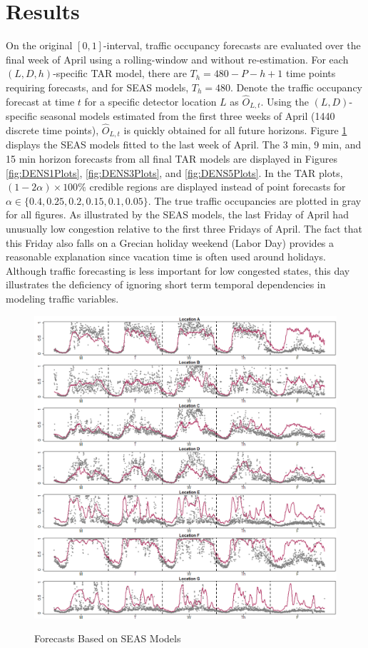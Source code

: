 \section{Results}
\label{sec:trafficresults}
On the original $[0,1]$-interval, traffic occupancy forecasts are evaluated over the final week of April using a rolling-window and without re-estimation. For each $(L,D,h)$-specific TAR model, there are $T_h=480-P-h+1$ time points requiring forecasts, and for SEAS models, $T_h=480$. Denote the traffic occupancy forecast at time $t$ for a specific detector location $L$ as $\hat{O}_{L,t}$. Using the $(L,D)$-specific seasonal models estimated from the first three weeks of April (1440 discrete time points), $\hat{O}_{L,t}$ is quickly obtained for all future horizons. Figure \ref{fig:SEASESTPlots} displays the SEAS models fitted to the last week of April. The 3 min, 9 min, and 15 min horizon forecasts from all final TAR models are displayed in Figures \ref{fig:DENS1Plots}, \ref{fig:DENS3Plots}, and \ref{fig:DENS5Plots}. In the TAR plots, $(1-2\alpha)\times 100\%$ credible regions are displayed instead of point forecasts for $\alpha \in \{0.4,0.25,0.2,0.15,0.1,0.05\}$. The true traffic occupancies are plotted in gray for all figures. As illustrated by the SEAS models, the last Friday of April had unusually low congestion relative to the first three Fridays of April. The fact that this Friday also falls on a Grecian holiday weekend (Labor Day) provides a reasonable explanation since vacation time is often used around holidays. Although traffic forecasting is less important for low congested states, this day illustrates the deficiency of ignoring short term temporal dependencies in modeling traffic variables. 

\begin{figure}[htbp]
\caption{Forecasts Based on SEAS Models}
\includegraphics[width=\textwidth]{SEASESTPlots}
\label{fig:SEASESTPlots}
\end{figure}


